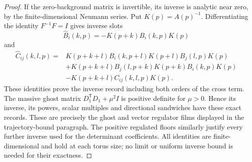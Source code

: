 \begin{proof}
If the zero-background matrix is invertible, its inverse is analytic
near zero, by the finite-dimensional Neumann series. Put $K(p)=A(p)^{-1}$.
Differentiating the identity $F^{-1}F=I$ gives inverse slots
\[
 \widehat B_i(k,p)=-K(p+k)B_i(k,p)K(p)
\]
and
\begin{align*}
 \widehat C_{ij}(k,l,p)={}&
 K(p+k+l)B_i(k,p+l)K(p+l)B_j(l,p)K(p)\\
 &+K(p+k+l)B_j(l,p+k)K(p+k)B_i(k,p)K(p)\\
 &-K(p+k+l)C_{ij}(k,l,p)K(p).
\end{align*}
These identities prove the inverse record including both orders of the
cross term. The massive ghost matrix $D_1^{\mathsf T}D_1+\mu^2I$ is
positive definite for $\mu>0$. Hence its inverse, its powers, scalar
multiples and directional sandwiches have these exact records. These
are precisely the ghost and vector regulator films displayed in the
trajectory-bound paragraph. The positive regulated floors similarly
justify every further inverse used for the determinant coefficients.
All identities are finite-dimensional and hold at each torus size;
no limit or uniform inverse bound is needed for their exactness.
\end{proof}

